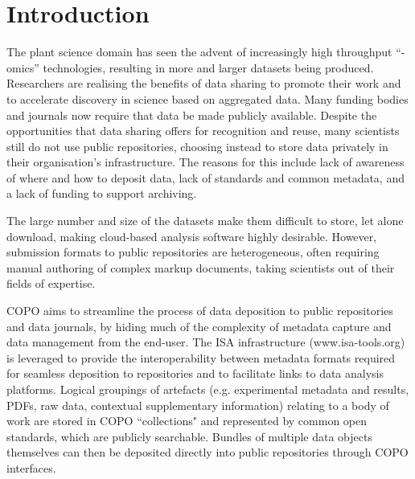 \documentclass[runningheads,a4paper]{llncs}
\begin{document}
\section{Introduction}
The plant science domain has seen the advent of increasingly high
throughput “-omics” technologies, resulting in more and larger
datasets being produced. Researchers are realising the benefits of
data sharing to promote their work and to accelerate discovery in
science based on aggregated data. Many funding bodies and journals now
require that data be made publicly available. Despite the
opportunities that data sharing offers for recognition and reuse, many
scientists still do not use public repositories, choosing instead to
store data privately in their organisation’s infrastructure. The
reasons for this include lack of awareness of where and how to deposit
data, lack of standards and common metadata, and a lack of funding to
support archiving.

The large number and size of the datasets make them difficult to
store, let alone download, making cloud-based analysis software highly
desirable. However, submission formats to public repositories are
heterogeneous, often requiring manual authoring of complex markup
documents, taking scientists out of their fields of expertise.

COPO aims to streamline the process of data deposition to public
repositories and data journals, by hiding much of the complexity of
metadata capture and data management from the end-user. The ISA
infrastructure (www.isa-tools.org) is leveraged to provide the
interoperability between metadata formats required for seamless
deposition to repositories and to facilitate links to data analysis
platforms. Logical groupings of artefacts (e.g. experimental metadata
and results, PDFs, raw data, contextual supplementary information)
relating to a body of work are stored in COPO “collections" and
represented by common open standards, which are publicly
searchable. Bundles of multiple data objects themselves can then be
deposited directly into public repositories through COPO interfaces.

\vspace*{-0.2in}
\end{document}
